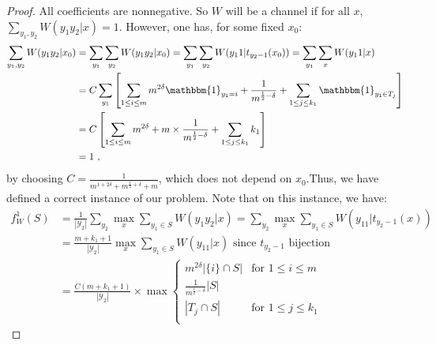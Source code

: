 \begin{proof}
  All coefficients are nonnegative. So $W$ will be a channel if for all $x$, $\sum_{y_1,y_2} W(y_1 y_2|x) = 1$. However, one has, for some fixed $x_0$:
  \begin{equation}
    \begin{aligned}
      \sum_{y_1,y_2} W(y_1 y_2|x_0) &= \sum_{y_1} \sum_{y_2} W(y_1 y_2|x_0) = \sum_{y_1} \sum_{y_2}  W(y_1 1|t_{y_2-1}(x_0)) = \sum_{y_1} \sum_x  W(y_1 1|x) \\
      &= C \sum_{y_1}\left[\sum_{1 \leq i \leq m} m^{2\delta}\mathbbm{1}_{y_1=i} + \frac{1}{m^{\frac{1}{2}-\delta}} + \sum_{1 \leq j \leq k_1} \mathbbm{1}_{y_1 \in T_j}\right]\\
      &= C \left[\sum_{1 \leq i \leq m} m^{2\delta} + m\times\frac{1}{m^{\frac{1}{2}-\delta}} + \sum_{1 \leq j \leq k_1} k_1\right]\\
      &= 1 \ ,
    \end{aligned}
  \end{equation}
 by choosing $C = \frac{1}{m^{1+2\delta} + m^{\frac{1}{2}+\delta} + m}$, which does not depend on $x_0$.Thus, we have defined a correct instance of our problem. Note that on this instance, we have:
  \begin{equation}
    \begin{aligned}
      f_W^1(S) &= \frac{1}{|\mathcal{Y}_2|}\sum_{y_2} \max_x \sum_{y_1 \in S} W(y_1y_2|x) = \sum_{y_2} \max_x \sum_{y_1 \in S} W(y_11|t_{y_2-1}(x))\\
      &= \frac{m+k_1+1}{|\mathcal{Y}_2|}\max_x \sum_{y_1 \in S} W(y_11|x) \text{ since $t_{y_2-1}$ bijection}\\
      &= \frac{C(m+k_1+1)}{|\mathcal{Y}_2|} \times \max\begin{cases}
      m^{2\delta}|\{i\} \cap S| & \text{for } 1 \leq i \leq m\\
      \frac{1}{m^{\frac{1}{2}-\delta}}|S|\\
      |T_j \cap S| & \text{for } 1 \leq j \leq k_1\\
      \end{cases}
    \end{aligned}
  \end{equation}
      

\end{proof}
